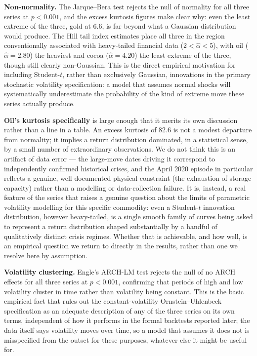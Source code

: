 \documentclass[preprint,12pt,authoryear]{elsarticle}
\begin{document}
\textbf{Non-normality.} The Jarque--Bera test rejects the null of
normality for all three series at $p < 0.001$, and the excess kurtosis
figures make clear why: even the least extreme of the three, gold at
6.6, is far beyond what a Gaussian distribution would produce. The
Hill tail index estimates place all three in the region conventionally
associated with heavy-tailed financial data ($2 < \hat{\alpha} < 5$),
with oil ($\hat{\alpha} = 2.80$) the heaviest and cocoa
($\hat{\alpha} = 4.20$) the least extreme of the three, though still
clearly non-Gaussian. This is the direct empirical motivation for
including Student-$t$, rather than exclusively Gaussian, innovations
in the primary stochastic volatility specification: a model that
assumes normal shocks will systematically underestimate the
probability of the kind of extreme move these series actually produce.

\textbf{Oil's kurtosis specifically} is large enough that it merits
its own discussion rather than a line in a table. An excess kurtosis
of 82.6 is not a modest departure from normality; it implies a return
distribution dominated, in a statistical sense, by a small number of
extraordinary observations. We do not think this is an artifact of
data error — the large-move dates driving it correspond to
independently confirmed historical crises, and the April 2020 episode
in particular reflects a genuine, well-documented physical constraint
(the exhaustion of storage capacity) rather than a modelling or
data-collection failure. It is, instead, a real feature of the series
that raises a genuine question about the limits of parametric
volatility modelling for this specific commodity: even a Student-$t$
innovation distribution, however heavy-tailed, is a single smooth
family of curves being asked to represent a return distribution shaped
substantially by a handful of qualitatively distinct crisis regimes.
Whether that is achievable, and how well, is an empirical question we
return to directly in the results, rather than one we resolve here by
assumption.

\textbf{Volatility clustering.} Engle's ARCH-LM test rejects the null
of no ARCH effects for all three series at $p < 0.001$, confirming
that periods of high and low volatility cluster in time rather than
volatility being constant. This is the basic empirical fact that rules
out the constant-volatility Ornstein--Uhlenbeck specification as an
adequate description of any of the three series on its own terms,
independent of how it performs in the formal backtests reported later;
the data itself says volatility moves over time, so a model that
assumes it does not is misspecified from the outset for these
purposes, whatever else it might be useful for.
\end{document}

